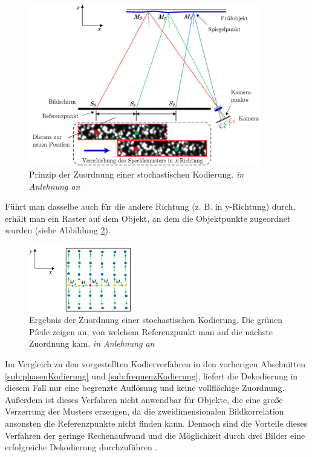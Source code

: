 \begin{figure}[H]
	\centering
	\includegraphics[width=0.9\textwidth]{02_grundlagenZurDeflektometrie/rekonstruktion/stochastischeKodierung/figures/Prinzip}
	\caption[Prinzip der Zuordnung einer stochastischen Kodierung]{Prinzip der Zuordnung einer stochastischen Kodierung. \textit{in Anlehnung an} \cite{specklePattern}}
	\label{img:prinzipStoKodierung}
\end{figure}
%
\noindent
Führt man dasselbe auch für die andere Richtung (z. B. in y-Richtung) durch, erhält man ein Raster auf dem Objekt, an dem die Objektpunkte zugeordnet wurden (siehe Abbildung \ref{img:ergebnisStoKodierung}).
%
\begin{figure}[H]
	\centering
	\includegraphics[width=0.4\textwidth]{02_grundlagenZurDeflektometrie/rekonstruktion/stochastischeKodierung/figures/Ergebnis}
	\caption[Ergebnis der Zuordnung einer stochastischen Kodierung]{Ergebnis der Zuordnung einer stochastischen Kodierung. Die grünen Pfeile zeigen an, von welchem Referenzpunkt man auf die nächste Zuordnung kam. \textit{in Anlehnung an} \cite{specklePattern}}
	\label{img:ergebnisStoKodierung}
\end{figure}
%
\noindent
Im Vergleich zu den vorgestellten Kodierverfahren in den vorherigen Abschnitten \ref{sub:phasenKodierung} und \ref{sub:frequenzKodierung}, liefert die Dekodierung in diesem Fall nur eine begrenzte Auflösung und keine vollflächige Zuordnung.
Außerdem ist dieses Verfahren nicht anwendbar für Objekte, die eine große Verzerrung der Musters erzeugen, da die zweidimensionalen Bildkorrelation ansonsten die Referenzpunkte nicht finden kann.
Dennoch sind die Vorteile dieses Verfahren der geringe Rechenaufwand und die Möglichkeit durch drei Bilder eine erfolgreiche Dekodierung durchzuführen \cite{specklePattern}.